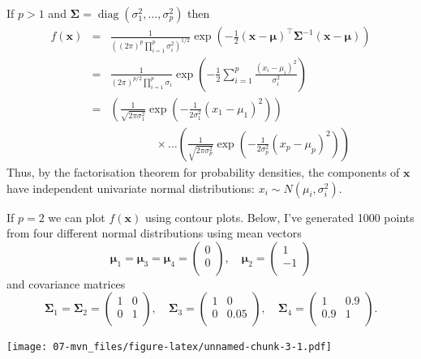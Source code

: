 \documentclass[
]{book}
\theoremstyle{definition}
\theoremstyle{definition}
\theoremstyle{definition}
\theoremstyle{definition}
\theoremstyle{remark}
\begin{document}
If \(p>1\) and \(\boldsymbol{\Sigma}= \operatorname{diag}(\sigma_1^2, \ldots, \sigma_p^2)\) then
\begin{eqnarray*}
f(\mathbf x) &=& \frac{1}{((2 \pi)^{p}\prod_{i=1}^p \sigma_i^2)^{1/2}} \exp \left(-\frac{1}{2}(\mathbf x- {\boldsymbol{\mu}})^\top \boldsymbol{\Sigma}^{-1}(\mathbf x- {\boldsymbol{\mu}}) \right)\\
&=& \frac{1}{(2 \pi)^{p/2}\prod_{i=1}^p \sigma_i} \exp \left(-\frac{1}{2} \sum_{i=1}^p \frac{(x_i - \mu_i)^2}{\sigma_i^2} \right)\\
&=& \left(\frac{1}{\sqrt{2 \pi\sigma_1^2}} \exp \left(-\frac{1}{2\sigma_1^2} (x_1 - \mu_1)^2 \right)\right)\\
 && \qquad \qquad \times \ldots \left(\frac{1}{\sqrt{2 \pi \sigma_p^2}} \exp \left(-\frac{1}{2\sigma_p^2} (x_p - \mu_p)^2 \right)\right)
\end{eqnarray*}
Thus, by the factorisation theorem for probability densities, the components of \(\mathbf x\) have independent univariate normal distributions: \(x_i \sim N(\mu_i, \sigma_i^2)\).

If \(p=2\) we can plot \(f(\mathbf x)\) using contour plots. Below, I've generated 1000 points from four different normal distributions using mean vectors
\[{\boldsymbol{\mu}}_1={\boldsymbol{\mu}}_3={\boldsymbol{\mu}}_4=\begin{pmatrix}0 \\0 \\\end{pmatrix}, \quad {\boldsymbol{\mu}}_2=\begin{pmatrix}1 \\-1 \\\end{pmatrix}\]
and covariance matrices
\[\boldsymbol{\Sigma}_1=\boldsymbol{\Sigma}_2=\begin{pmatrix}1&0 \\0&1 \\\end{pmatrix}, \quad \boldsymbol{\Sigma}_3=\begin{pmatrix}1&0 \\0&0.05 \\\end{pmatrix}, \quad \boldsymbol{\Sigma}_4=\begin{pmatrix}1&0.9 \\0.9&1 \\\end{pmatrix}.\]

\texttt{[image: 07-mvn\_files/figure-latex/unnamed-chunk-3-1.pdf]}
\end{document}
